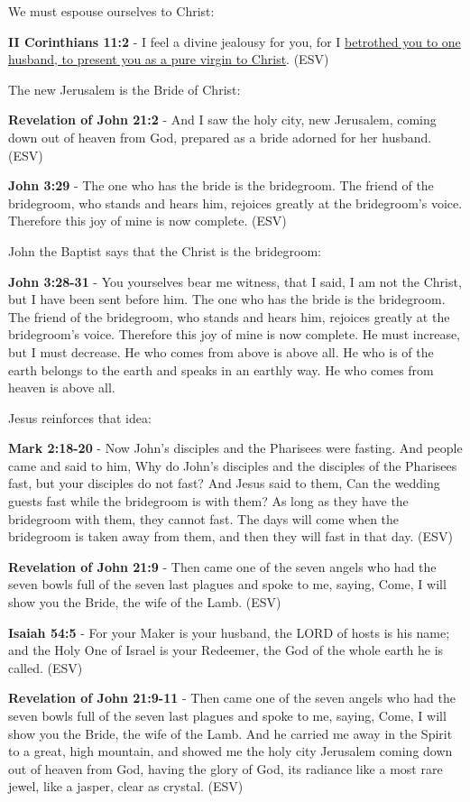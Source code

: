 \documentclass[11pt]{article}
\begin{document}
We must espouse ourselves to Christ:

\textbf{II Corinthians 11:2} - I feel a divine jealousy for you, for I \uline{betrothed you to one husband, to present you as a pure virgin to Christ}. (ESV)

The new Jerusalem is the Bride of Christ:

\textbf{Revelation of John 21:2} - And I saw the holy city, new Jerusalem, coming down out of heaven from God, prepared as a bride adorned for her husband. (ESV)

\textbf{John 3:29} - The one who has the bride is the bridegroom. The friend of the bridegroom, who stands and hears him, rejoices greatly at the bridegroom's voice. Therefore this joy of mine is now complete. (ESV)

John the Baptist says that the Christ is the bridegroom:

\textbf{John 3:28-31} - You yourselves bear me witness, that I said, I am not the Christ, but I have been sent before him. The one who has the bride is the bridegroom. The friend of the bridegroom, who stands and hears him, rejoices greatly at the bridegroom's voice. Therefore this joy of mine is now complete. He must increase, but I must decrease. He who comes from above is above all. He who is of the earth belongs to the earth and speaks in an earthly way. He who comes from heaven is above all.

Jesus reinforces that idea:

\textbf{Mark 2:18-20} - Now John's disciples and the Pharisees were fasting. And people came and said to him, Why do John's disciples and the disciples of the Pharisees fast, but your disciples do not fast? And Jesus said to them, Can the wedding guests fast while the bridegroom is with them? As long as they have the bridegroom with them, they cannot fast. The days will come when the bridegroom is taken away from them, and then they will fast in that day. (ESV)

\textbf{Revelation of John 21:9} - Then came one of the seven angels who had the seven bowls full of the seven last plagues and spoke to me, saying, Come, I will show you the Bride, the wife of the Lamb. (ESV)

\textbf{Isaiah 54:5} - For your Maker is your husband, the LORD of hosts is his name; and the Holy One of Israel is your Redeemer, the God of the whole earth he is called. (ESV)

\textbf{Revelation of John 21:9-11} - Then came one of the seven angels who had the seven bowls full of the seven last plagues and spoke to me, saying, Come, I will show you the Bride, the wife of the Lamb. And he carried me away in the Spirit to a great, high mountain, and showed me the holy city Jerusalem coming down out of heaven from God, having the glory of God, its radiance like a most rare jewel, like a jasper, clear as crystal. (ESV)
\end{document}
